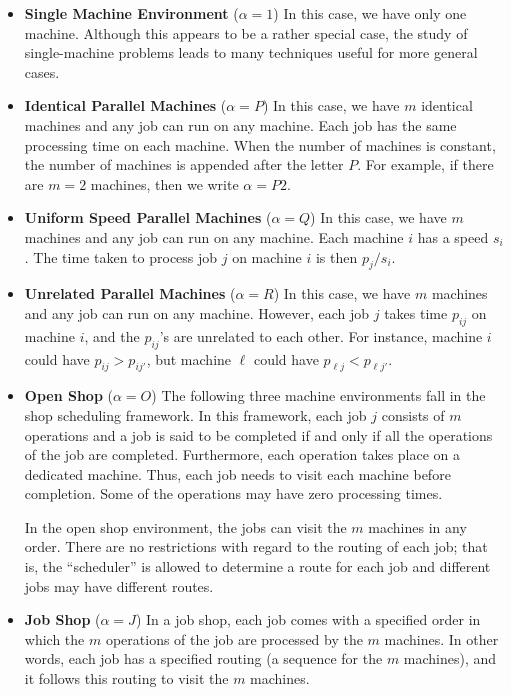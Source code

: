 \begin{itemize}

    \item {\bf Single Machine Environment} ($\alpha = 1$) In this case, we 
    have only one machine. Although this appears to be a rather special case, 
    the study of single-machine problems leads to many techniques useful for 
    more general cases.

    \item {\bf Identical Parallel Machines} ($\alpha = P$) In this case, we 
    have $m$ identical machines and any job can run on any machine. Each job 
    has the same processing time on each machine. When the number of machines 
    is constant, the number of machines is appended after the letter $P$.
    For example, if there are $m = 2$ machines, then we write $\alpha = P2$.

    \item {\bf Uniform Speed Parallel Machines} ($\alpha = Q$) In this case, 
    we have $m$ machines and any job can run on any machine. Each machine 
    $i$ has a speed $s_i$. The time taken to process job $j$ on machine $i$ 
    is then $p_j/s_i$.

    \item {\bf Unrelated Parallel Machines} ($\alpha = R$) In this case, we 
    have $m$ machines and any job can run on any machine. However, each 
    job $j$ takes time $p_{ij}$ on machine $i$, and the $p_{ij}$'s are 
    unrelated to each other. For instance, machine $i$ could have 
    $p_{ij} > p_{ij'}$, but machine $\ell$ could have $p_{\ell j} < 
    p_{\ell j'}$. 

    \item {\bf Open Shop} ($\alpha = O$) The following three machine 
    environments fall in the shop scheduling framework. In this framework, 
    each job $j$ consists of $m$ operations and a job is said to be completed 
    if and only if all the operations of the job are completed. Furthermore, 
    each operation takes place on a dedicated machine. Thus, each job
    needs to visit each machine before completion. Some of the operations may 
    have zero processing times. 
    
    In the open shop environment, the jobs can 
    visit the $m$ machines in any order. There are no restrictions with regard 
    to the routing of each job; that is, the ``scheduler'' is allowed to 
    determine a route for each job and different jobs may have different routes.

    \item {\bf Job Shop} ($\alpha = J$) In a job shop, each job comes with a 
    specified order in which the $m$ operations of the job are processed by 
    the $m$ machines. In other words, each job has a specified routing 
    (a sequence for the $m$ machines), and it follows this routing to visit 
    the $m$ machines.


\end{itemize}
